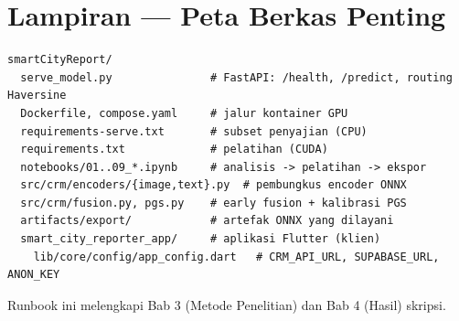 \documentclass[11pt,a4paper]{article}
\begin{document}
\section{Lampiran — Peta Berkas Penting}
\begin{lstlisting}
smartCityReport/
  serve_model.py               # FastAPI: /health, /predict, routing Haversine
  Dockerfile, compose.yaml     # jalur kontainer GPU
  requirements-serve.txt       # subset penyajian (CPU)
  requirements.txt             # pelatihan (CUDA)
  notebooks/01..09_*.ipynb     # analisis -> pelatihan -> ekspor
  src/crm/encoders/{image,text}.py  # pembungkus encoder ONNX
  src/crm/fusion.py, pgs.py    # early fusion + kalibrasi PGS
  artifacts/export/            # artefak ONNX yang dilayani
  smart_city_reporter_app/     # aplikasi Flutter (klien)
    lib/core/config/app_config.dart   # CRM_API_URL, SUPABASE_URL, ANON_KEY
\end{lstlisting}

\vfill
\begin{center}\small\color{cmt}
Runbook ini melengkapi Bab 3 (Metode Penelitian) dan Bab 4 (Hasil) skripsi.
\end{center}
\end{document}
